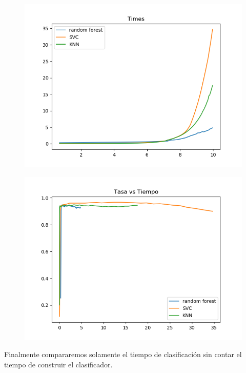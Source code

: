 \documentclass[8pt,a4paper]{{esannV2}}
\begin{document}
\begin{figure}[h]
\centering
\begin{minipage}{.5\textwidth}
  \centering
  \includegraphics[width=1\linewidth]{./CompararTiempos.png}
  \label{fig:test1}
\end{minipage}%
\begin{minipage}{.5\textwidth}
  \centering
  \includegraphics[width=1\linewidth]{./CompararAciertosvsTiempos.png}
  \label{fig:test2}
\end{minipage}
\end{figure}


Finalmente compararemos solamente el tiempo de clasificación sin contar el tiempo de construir el clasificador.
\end{document}
